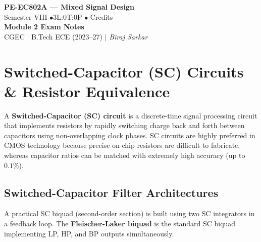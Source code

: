 \documentclass[12pt,a4paper]{article}
\begin{document}

\begin{center}
  {\LARGE\bfseries\color{myred} PE-EC802A --- Mixed Signal Design}\\[5pt]
  {\normalsize\color{mydark} Semester VIII \quad$\bullet$\quad 3L:0T:0P \quad$\bullet$ Credits}\\[3pt]
  {\normalsize\color{myteal}\textbf{Module 2 Exam Notes}}\\[3pt]
  {\small\color{mydark} CGEC \;$|$\; B.Tech ECE (2023--27) \;$|$\; \textit{Biraj Sarkar}}
\end{center}
\vspace{2pt}
\noindent{\color{myred}\rule{\linewidth}{1.5pt}}
\vspace{2pt}

\hypersetup{linkcolor=mydark}
\tableofcontents
\hypersetup{linkcolor=myteal}
\newpage

\section{Switched-Capacitor (SC) Circuits \& Resistor Equivalence}

\begin{tcolorbox}[defbox, title={\textbf{Switched-Capacitor Circuit Concept}}]
A \textbf{Switched-Capacitor (SC) circuit} is a discrete-time signal processing circuit that implements resistors by rapidly switching charge back and forth between capacitors using non-overlapping clock phases. SC circuits are highly preferred in CMOS technology because precise on-chip resistors are difficult to fabricate, whereas capacitor ratios can be matched with extremely high accuracy (up to $0.1\%$).
\end{tcolorbox}

\subsection{Switched-Capacitor Filter Architectures}
A practical SC biquad (second-order section) is built using two SC integrators in a feedback loop. The \textbf{Fleischer-Laker biquad} is the standard SC biquad implementing LP, HP, and BP outputs simultaneously.
\end{document}

